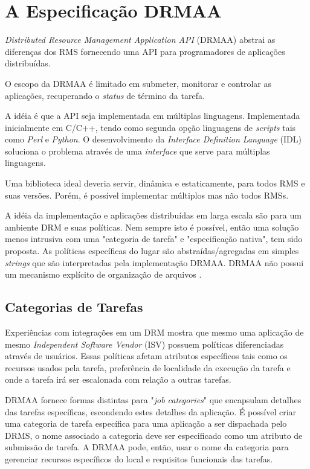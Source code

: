 \chapter{A Especificação DRMAA}
\label{cap:drmaa}

\emph{Distributed Resource Management Application API} (DRMAA) abstrai as diferenças dos RMS fornecendo uma API para programadores de aplicações distribuídas. 

O escopo da DRMAA é limitado em submeter, monitorar e controlar as aplicações, recuperando o \emph{status} de término da tarefa.

A idéia é que a API seja implementada em múltiplas linguagens. Implementada inicialmente em C/C++, tendo como segunda opção linguagens de \emph{scripts} tais como \emph{Perl} e \emph{Python}. O desenvolvimento da \emph{Interface Definition Language} (IDL) soluciona o problema através de uma \emph{interface} que serve para múltiplas linguagens.

Uma biblioteca ideal deveria servir, dinâmica e estaticamente, para todos RMS e suas versões. Porém, é possível implementar múltiplos mas não todos RMSs.

A idéia da implementação e aplicações distribuídas em larga escala são para um ambiente DRM e suas políticas. Nem sempre isto é possível, então uma solução menos intrusiva com uma "categoria de tarefa" e "especificação nativa", tem sido proposta. As políticas específicas do lugar são abstraídas/agregadas em simples \emph{strings} que são interpretadas pela implementação DRMAA. DRMAA não possui um mecanismo explícito de organização de arquivos  \cite{Rajic2004}. 

\section{Categorias de Tarefas}

Experiências com integrações em um DRM mostra que mesmo uma aplicação de mesmo \emph{Independent Software Vendor} (ISV) possuem políticas diferenciadas através de usuários. Essas políticas afetam atributos específicos tais como os recursos usados pela tarefa, preferência de localidade da execução da tarefa e onde a tarefa irá ser escalonada com relação a outras tarefas.

DRMAA fornece formas distintas para "\emph{job categories}" que encapsulam detalhes das tarefas específicas, escondendo estes detalhes da aplicação. É possível criar uma categoria de tarefa específica para uma aplicação a ser dispachada pelo DRMS, o nome associado a categoria deve ser especificado como um atributo de submissão de tarefa. A DRMAA pode, então, usar o nome da categoria para gerenciar recursos específicos do local e requisitos funcionais das tarefas.

